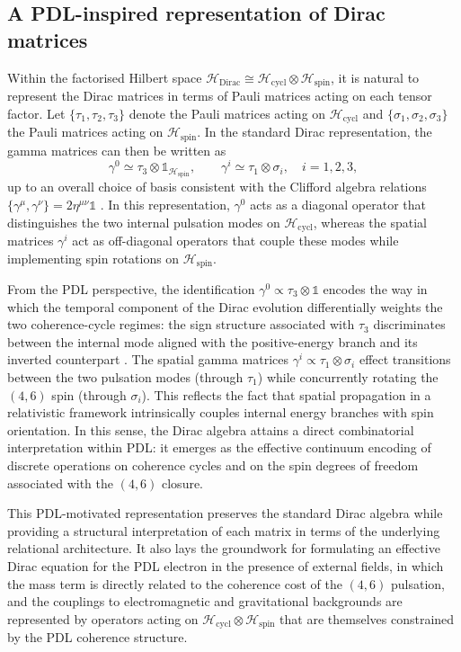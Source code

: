 \documentclass[11pt,a4paper]{article}
\theoremstyle{definition}
\newcommand{\Hspin}{\mathcal{H}_{\mathrm{spin}}}
\newcommand{\Hcycl}{\mathcal{H}_{\mathrm{cycl}}}
\newcommand{\HDirac}{\mathcal{H}_{\mathrm{Dirac}}}
\begin{document}
\subsection{A PDL-inspired representation of Dirac matrices}

Within the factorised Hilbert space $\HDirac \cong \Hcycl \otimes \Hspin$, it is natural to represent the Dirac matrices in terms of Pauli matrices acting on each tensor factor. Let $\{\tau_1,\tau_2,\tau_3\}$ denote the Pauli matrices acting on $\Hcycl$ and $\{\sigma_1,\sigma_2,\sigma_3\}$ the Pauli matrices acting on $\Hspin$. In the standard Dirac representation, the gamma matrices can then be written as
\[
\gamma^0 \simeq \tau_3 \otimes \mathbb{1}_{\Hspin}, \qquad 
\gamma^i \simeq \tau_1 \otimes \sigma_i, \quad i=1,2,3,
\]
up to an overall choice of basis consistent with the Clifford algebra relations $\{\gamma^\mu,\gamma^\nu\} = 2\eta^{\mu\nu}\mathbb{1}$ \cite{PDL_Global_Mapping_Structures_Results_Open_Problems}. In this representation, $\gamma^0$ acts as a diagonal operator that distinguishes the two internal pulsation modes on $\Hcycl$, whereas the spatial matrices $\gamma^i$ act as off-diagonal operators that couple these modes while implementing spin rotations on $\Hspin$.

From the PDL perspective, the identification $\gamma^0 \propto \tau_3 \otimes \mathbb{1}$ encodes the way in which the temporal component of the Dirac evolution differentially weights the two coherence-cycle regimes: the sign structure associated with $\tau_3$ discriminates between the internal mode aligned with the positive-energy branch and its inverted counterpart \cite{PDL,PDL_introduction}. The spatial gamma matrices $\gamma^i \propto \tau_1 \otimes \sigma_i$ effect transitions between the two pulsation modes (through $\tau_1$) while concurrently rotating the $(4,6)$ spin (through $\sigma_i$). This reflects the fact that spatial propagation in a relativistic framework intrinsically couples internal energy branches with spin orientation. In this sense, the Dirac algebra attains a direct combinatorial interpretation within PDL: it emerges as the effective continuum encoding of discrete operations on coherence cycles and on the spin degrees of freedom associated with the $(4,6)$ closure.

This PDL-motivated representation preserves the standard Dirac algebra while providing a structural interpretation of each matrix in terms of the underlying relational architecture. It also lays the groundwork for formulating an effective Dirac equation for the PDL electron in the presence of external fields, in which the mass term is directly related to the coherence cost of the $(4,6)$ pulsation, and the couplings to electromagnetic and gravitational backgrounds are represented by operators acting on $\Hcycl \otimes \Hspin$ that are themselves constrained by the PDL coherence structure.
\end{document}
